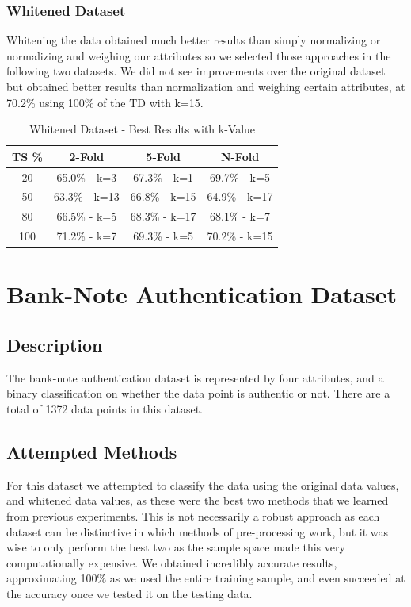 \documentclass[conference]{acmsiggraph}
\begin{document}
\subsubsection{Whitened Dataset}
Whitening the data obtained much better results than simply normalizing or normalizing and weighing our attributes so we selected those approaches in the following two datasets. We did not see improvements over the original dataset but obtained better results than normalization and weighing certain attributes, at 70.2\% using 100\% of the TD with k=15.
\begin{table}[h]
\caption{Whitened Dataset - Best Results with k-Value}
\centering
\begin{tabular}{c c c c}
\hline\hline
TS \% & 2-Fold & 5-Fold & N-Fold \\ [0.5ex]
\hline
20 & 65.0\% - k=3 & 67.3\% - k=1 & 69.7\% - k=5 \\
50 & 63.3\% - k=13 & 66.8\% - k=15 & 64.9\% - k=17 \\
80 & 66.5\% - k=5 & 68.3\% - k=17 & 68.1\% - k=7 \\
100 & 71.2\% - k=7 & 69.3\% - k=5 & 70.2\% - k=15 \\
\hline
\end{tabular}
\label{alc_w_res_table}
\end{table}

\section{Bank-Note Authentication Dataset}
\subsection{Description}
The bank-note authentication dataset is represented by four attributes, and a binary classification on whether the data point is authentic or not. There are a total of 1372 data points in this dataset.
\subsection {Attempted Methods}
For this dataset we attempted to classify the data using the original data values, and whitened data values, as these were the best two methods that we learned from previous experiments. This is not necessarily a robust approach as each dataset can be distinctive in which methods of pre-processing work, but it was wise to only perform the best two as the sample space made this very computationally expensive. We obtained incredibly accurate results, approximating 100\% as we used the entire training sample, and even succeeded at the accuracy once we tested it on the testing data. 
\end{document}
